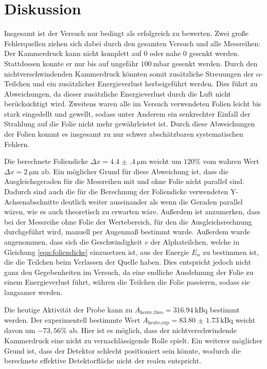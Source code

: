 \newpage
\section{Diskussion}
\label{sec:Diskussion}

Insgesamt ist der Versuch nur bedingt als erfolgreich zu bewerten. Zwei große Fehlerquellen ziehen sich dabei durch den gesamten Versuch und alle Messreihen: Der Kammerdruck kann nicht komplett auf $0$ oder nahe $0$ gesenkt werden. Stattdessen konnte er nur bis auf ungefähr $\SI{100}{\milli\bar}$ gesenkt werden. Durch den nichtverschwindenden Kammerdruck
könnten somit zusätzliche Streuungen der $\alpha$-Teilchen und ein zusätzlicher
Energieverlust herbeigeführt werden. Dies führt zu Abweichungen, da dieser zusätzliche Energieverlust durch die Luft nicht berücksichtigt wird.
Zweitens waren alle im Versuch verwendeten Folien leicht bis stark eingedellt und gewellt, sodass unter Anderem ein senkrechter Einfall der Strahlung auf die Folie nicht mehr gewährleistet ist. Durch diese Abweichungen der Folien kommt es insgesamt zu nur schwer abschätzbaren systematischen Fehlern.

Die berechnete Foliendicke $\Delta x = \SI{4.4(4)}{\micro\metre}$ weicht um
$120\%$ vom wahren Wert $\Delta x = \SI{2}{\micro\metre}$ ab. Ein möglicher Grund für diese
Abweichung ist, dass die Ausgleichsgeraden für die Messreihen mit und ohne Folie
nicht parallel sind. Dadurch sind auch die für die Berechnung der Foliendicke verwendeten
Y-Achsenabschnitte deutlich weiter auseinander als wenn die Geraden parallel wären,
wie es auch theoretisch zu erwarten wäre. Außerdem ist anzumerken, dass
bei der Messreihe ohne Folie der Wertebereich, für den die Ausgleichsrechnung durchgeführt wird,
manuell per Augenmaß bestimmt wurde.
Außerdem wurde angenommen, dass sich die Geschwindigkeit $v$ der Alphateilchen, welche in Gleichung \eqref{eqn:foliendicke} einzusetzen ist, aus der Energie $E_\alpha$ zu bestimmen ist, die die Teilchen beim Verlassen der Quelle haben. Dies entspricht jedoch nicht ganz den Gegebenheiten im Versuch, da eine endliche Ausdehnung der Folie zu einem Energieverlust führt, währen die Teilchen die Folie passieren, sodass sie langsamer werden.

Die heutige Aktivität der Probe kann zu $A_{\text{heute,theo}}= \SI{316.94}{\kilo\becquerel}$
bestimmt werden. Der experimentell bestimmte Wert
$A_{\text{heute,exp}}=\SI{83.80(173)}{\kilo\becquerel}$ weicht davon um
$-73{,}56\%$ ab. Hier ist es möglich, dass der nichtverschwindende Kammerdruck eine nicht zu vernachlässigende Rolle spielt. Ein weiterer  möglicher Grund ist, dass der Detektor
schlecht positioniert sein könnte, wodurch die berechnete effektive Detektorfläche
nicht der realen entspricht.

